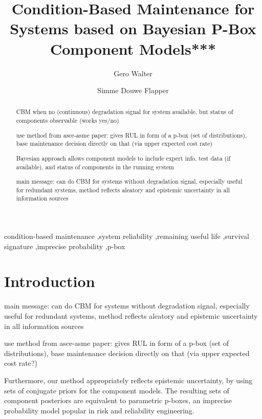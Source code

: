 \documentclass[authoryear]{elsarticle}
\begin{document}

\begin{frontmatter}
\title{Condition-Based Maintenance for Systems based on Bayesian P-Box Component Models***}

\author[tue]{Gero Walter}
\author[tue]{Simme Douwe Flapper}

\address[tue]{School of Industrial Engineering, Eindhoven University of Technology, Eindhoven, Netherlands}


\begin{abstract}
CBM when no (continuous) degradation signal for system available, but status of components observable (works yes/no)

use method from asce-asme paper:
gives RUL in form of a p-box (set of distributions), base maintenance decision directly on that
(via upper expected cost rate)

Bayesian approach allows
component models to include expert info, test data (if available), and status of components in the running system

main message: can do CBM for systems without degradation signal,
especially useful for redundant systems,
method reflects aleatory and epistemic uncertainty in all information sources
\end{abstract}

\begin{keyword}
condition-based maintenance \sep system reliability \sep remaining useful life \sep survival signature \sep imprecise probability \sep p-box
\end{keyword}
\end{frontmatter}


\section{Introduction}
\label{intro}

main message:
can do CBM for systems without degradation signal,
especially useful for redundant systems,
method reflects aleatory and epistemic uncertainty in all information sources

use method from asce-asme paper:
gives RUL in form of a p-box (set of distributions), base maintenance decision directly on that
(via upper expected cost rate?)

Furthermore, our method appropriately reflects epistemic uncertainty,
by using sets of conjugate priors \citep{diss} for the component models.
The resulting sets of component posteriors are equivalent to parametric p-boxes,
an imprecise probability model popular in risk and reliability engineering.
\end{document}
